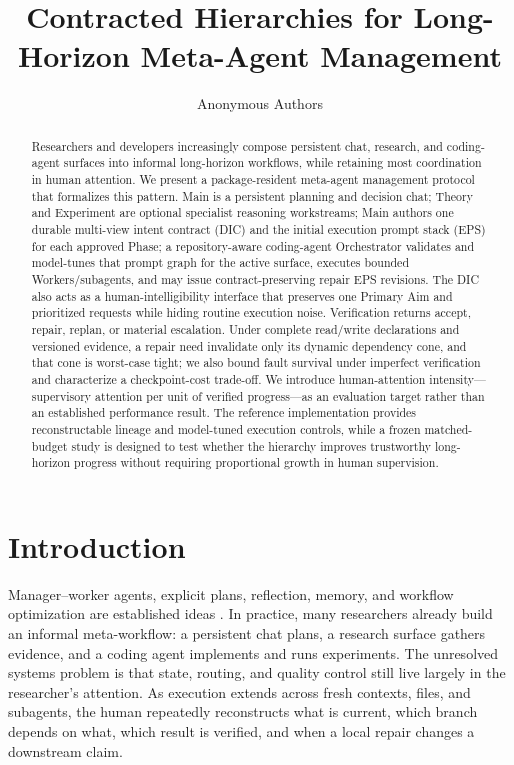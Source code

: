 \documentclass{article}
\title{Contracted Hierarchies for Long-Horizon Meta-Agent Management}
\author{Anonymous Authors}
\date{}
\begin{document}
\maketitle
\begin{abstract}
Researchers and developers increasingly compose persistent chat, research, and coding-agent surfaces into informal long-horizon workflows, while retaining most coordination in human attention. We present a package-resident meta-agent management protocol that formalizes this pattern. Main is a persistent planning and decision chat; Theory and Experiment are optional specialist reasoning workstreams; Main authors one durable multi-view intent contract (DIC) and the initial execution prompt stack (EPS) for each approved Phase; a repository-aware coding-agent Orchestrator validates and model-tunes that prompt graph for the active surface, executes bounded Workers/subagents, and may issue contract-preserving repair EPS revisions. The DIC also acts as a human-intelligibility interface that preserves one Primary Aim and prioritized requests while hiding routine execution noise. Verification returns accept, repair, replan, or material escalation. Under complete read/write declarations and versioned evidence, a repair need invalidate only its dynamic dependency cone, and that cone is worst-case tight; we also bound fault survival under imperfect verification and characterize a checkpoint-cost trade-off. We introduce human-attention intensity---supervisory attention per unit of verified progress---as an evaluation target rather than an established performance result. The reference implementation provides reconstructable lineage and model-tuned execution controls, while a frozen matched-budget study is designed to test whether the hierarchy improves trustworthy long-horizon progress without requiring proportional growth in human supervision.
\end{abstract}

\section{Introduction}
Manager--worker agents, explicit plans, reflection, memory, and workflow optimization are established ideas \citep{yao2023react,wu2023autogen,hong2024metagpt,hu2025adas}. In practice, many researchers already build an informal meta-workflow: a persistent chat plans, a research surface gathers evidence, and a coding agent implements and runs experiments. The unresolved systems problem is that state, routing, and quality control still live largely in the researcher's attention. As execution extends across fresh contexts, files, and subagents, the human repeatedly reconstructs what is current, which branch depends on what, which result is verified, and when a local repair changes a downstream claim.
\end{document}
